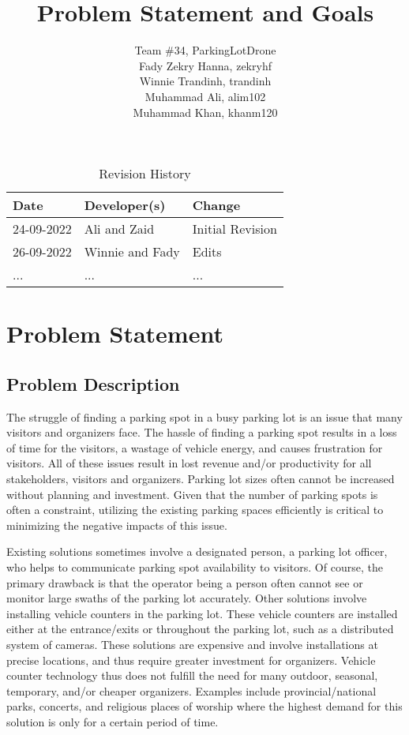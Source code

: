 \documentclass{article}
\title{Problem Statement and Goals\\\progname}
\author{\authname Team \#34, ParkingLotDrone \\
Fady Zekry Hanna, zekryhf \\
Winnie Trandinh, trandinh \\
Muhammad Ali, alim102 \\
Muhammad Khan, khanm120}
\date{}
\begin{document}
\maketitle

\begin{table}[hp]
\caption{Revision History} \label{TblRevisionHistory}
\begin{tabularx}{\textwidth}{llX}
\toprule
\textbf{Date} & \textbf{Developer(s)} & \textbf{Change}\\
\midrule
24-09-2022 & Ali and Zaid & Initial Revision\\
26-09-2022 & Winnie and Fady & Edits \\
... & ... & ...\\
\bottomrule
\end{tabularx}
\end{table}

\section{Problem Statement}
\subsection{Problem Description}

\indent The struggle of finding a parking spot in a busy parking lot is an issue that many visitors and organizers face. The hassle of finding a parking spot results in a loss of time for the visitors, a wastage of vehicle energy, and causes frustration for visitors. All of these issues result in lost revenue and/or productivity for all stakeholders, visitors and organizers. Parking lot sizes often cannot be increased without planning and investment. Given that the number of parking spots is often a constraint, utilizing the existing parking spaces efficiently is critical to minimizing the negative impacts of this issue.


\indent Existing solutions sometimes involve a designated person, a parking lot officer, who helps to communicate parking spot availability to visitors. Of course, the primary drawback is that the operator being a person often cannot see or monitor large swaths of the parking lot accurately. Other solutions involve installing vehicle counters in the parking lot. These vehicle counters are installed either at the entrance/exits or throughout the parking lot, such as a distributed system of cameras.  These solutions are expensive and involve installations at precise locations, and thus require greater investment for organizers. Vehicle counter technology thus does not fulfill the need for many outdoor, seasonal, temporary, and/or cheaper organizers.  Examples include provincial/national parks, concerts, and religious places of worship where the highest demand for this solution is only for a certain period of time. 
\end{document}
